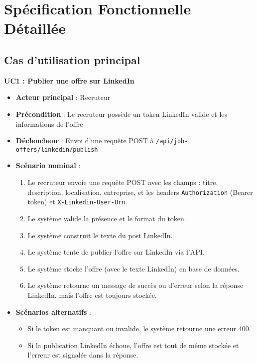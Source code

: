 \documentclass[a4paper,12pt]{report}
\begin{document}
\chapter{Spécification Fonctionnelle Détaillée}

\section{Cas d'utilisation principal}
\textbf{UC1 : Publier une offre sur LinkedIn}
\begin{itemize}[leftmargin=*]
    \item \textbf{Acteur principal} : Recruteur
    \item \textbf{Précondition} : Le recruteur possède un token LinkedIn valide et les informations de l'offre
    \item \textbf{Déclencheur} : Envoi d'une requête POST à \texttt{/api/job-offers/linkedin/publish}
    \item \textbf{Scénario nominal} :
    \begin{enumerate}[leftmargin=*]
        \item Le recruteur envoie une requête POST avec les champs : titre, description, localisation, entreprise, et les headers \texttt{Authorization} (Bearer token) et \texttt{X-Linkedin-User-Urn}.
        \item Le système valide la présence et le format du token.
        \item Le système construit le texte du post LinkedIn.
        \item Le système tente de publier l'offre sur LinkedIn via l'API.
        \item Le système stocke l'offre (avec le texte LinkedIn) en base de données.
        \item Le système retourne un message de succès ou d'erreur selon la réponse LinkedIn, mais l'offre est toujours stockée.
    \end{enumerate}
    \item \textbf{Scénarios alternatifs} :
    \begin{itemize}
        \item Si le token est manquant ou invalide, le système retourne une erreur 400.
        \item Si la publication LinkedIn échoue, l'offre est tout de même stockée et l'erreur est signalée dans la réponse.
    \end{itemize}
\end{itemize}
\end{document}
